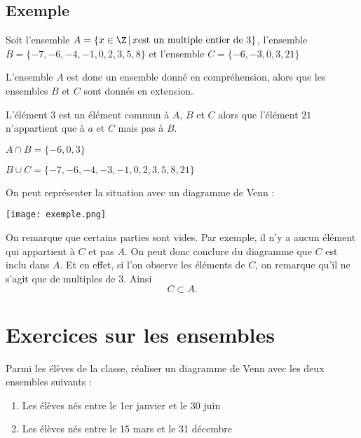 \subsection{Exemple}

Soit l'ensemble $A=\{x\in \Z \, | \, x \mbox{est un multiple entier de 3}\}$, l'ensemble $B = \{-7, -6, -4, -1, 0, 2, 3, 5, 8\}$ et l'ensemble $C=\{-6,-3,0,3,21\}$

L'ensemble $A$ est donc un ensemble donné en compréhension, alors que les ensembles $B$ et $C$ sont donnés en extension.

L'élément $3$ est un élément commun à $A$, $B$ et $C$ alors que l'élément $21$ n'appartient que à $a$ et $C$ mais pas à $B$.

$A\cap B = \{-6, 0, 3\}$

$B\cup C= \{-7,-6,-4,-3,-1,0,2,3,5,8,21\}$

On peut représenter la situation avec un diagramme de Venn :
\begin{center}
\texttt{[image: exemple.png]}
\end{center}

On remarque que certains parties sont vides. Par exemple, il n'y a aucun élément qui appartient à $C$ et pas $A$. On peut donc conclure du diagramme que $C$ est inclu dans $A$. Et en effet, si l'on observe les éléments de $C$, on remarque qu'il ne s'agit que de multiples de $3$. Ainsi 
$$
C \subset A.
$$
\newpage

\section{Exercices sur les ensembles}

\begin{exercice}Parmi les élèves de la classe, réaliser un diagramme de Venn avec les deux ensembles suivants :
	\begin{enumerate}[A]
	\item Les élèves nés entre le 1er janvier et le 30 juin
	\item Les élèves nés entre le 15 mars et le 31 décembre
	\end{enumerate}
\end{exercice}

